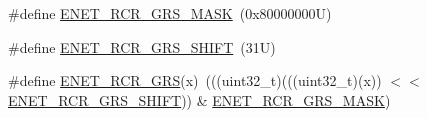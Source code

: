 \begin{DoxyCompactItemize}
\item 
\#define \mbox{\hyperlink{group___e_n_e_t___register___masks_ga01f144e600f9007df4d9cdc9d7f3879a}{E\+N\+E\+T\+\_\+\+R\+C\+R\+\_\+\+G\+R\+S\+\_\+\+M\+A\+SK}}~(0x80000000\+U)
\item 
\#define \mbox{\hyperlink{group___e_n_e_t___register___masks_ga6e192fa69584cca04e717c077d1bf702}{E\+N\+E\+T\+\_\+\+R\+C\+R\+\_\+\+G\+R\+S\+\_\+\+S\+H\+I\+FT}}~(31\+U)
\item 
\#define \mbox{\hyperlink{group___e_n_e_t___register___masks_ga8014a58a8b1a27953fae60cdd8ea07c6}{E\+N\+E\+T\+\_\+\+R\+C\+R\+\_\+\+G\+RS}}(x)~(((uint32\+\_\+t)(((uint32\+\_\+t)(x)) $<$$<$ \mbox{\hyperlink{group___e_n_e_t___register___masks_ga6e192fa69584cca04e717c077d1bf702}{E\+N\+E\+T\+\_\+\+R\+C\+R\+\_\+\+G\+R\+S\+\_\+\+S\+H\+I\+FT}})) \& \mbox{\hyperlink{group___e_n_e_t___register___masks_ga01f144e600f9007df4d9cdc9d7f3879a}{E\+N\+E\+T\+\_\+\+R\+C\+R\+\_\+\+G\+R\+S\+\_\+\+M\+A\+SK}})
\end{DoxyCompactItemize}
